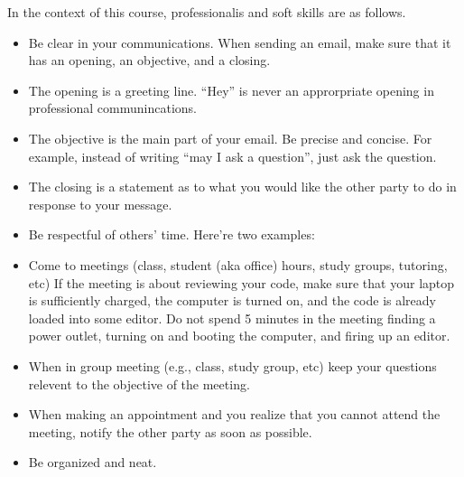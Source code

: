 \documentclass[letterpaper,10pt,english]{sphinxmanual}
\begin{document}
In the context of this course, professionalis and soft skills are as follows.
\begin{itemize}
\item {} 
Be clear in your communications. When sending an email, make sure that it has an opening, an objective, and a closing.

\end{itemize}
\begin{itemize}
\item {} 
The opening is a greeting line. “Hey” is never an approrpriate opening in professional communincations.

\item {} 
The objective is the main part of your email. Be precise and concise. For example, instead of writing “may I ask a question”, just ask the question.

\item {} 
The closing is a statement as to what you would like the other party to do in response to your message.

\end{itemize}
\begin{itemize}
\item {} 
Be respectful of others’ time. Here’re two examples:

\end{itemize}
\begin{itemize}
\item {} 
Come to meetings (class, student (aka office) hours, study groups, tutoring, etc)  If the meeting is about reviewing your code, make sure that your laptop is sufficiently charged, the computer is turned on, and the code is already loaded into some editor. Do not spend 5 minutes in the meeting finding a power outlet, turning on and booting the computer, and firing up an editor.

\item {} 
When in group meeting (e.g., class, study group, etc) keep your questions relevent to the objective of the meeting.

\item {} 
When making an appointment and you realize that you cannot attend the meeting, notify the other party as soon as possible.

\end{itemize}
\begin{itemize}
\item {} 
Be organized and neat.

\end{itemize}
\end{document}

